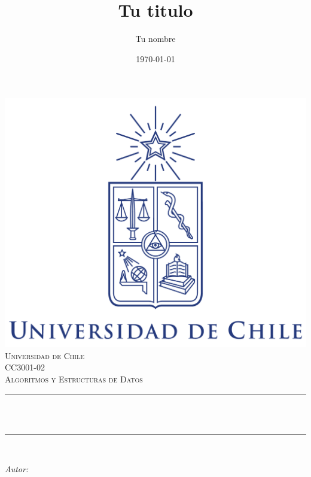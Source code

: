 \documentclass[12pt]{article}
\title{Tu titulo}					%
\author{Tu nombre}					%
\date{\today}						%
\makeatletter
\let\thetitle\@title
\let\theauthor\@author
\let\thedate\@date
\makeatother
\begin{document}

\begin{titlepage}
	\centering
    \vspace*{0.0 cm}
    \includegraphics[scale = 0.13]{Logo_Uchile_modern.png}\\[1.0 cm]	%
    \textsc{\LARGE Universidad de Chile}\\[2.0 cm]	%
	\textsc{\Large CC3001-02}\\[0.5 cm]				%
	\textsc{\large Algoritmos y Estructuras de Datos}\\[0.5 cm]		%
	\rule{\linewidth}{0.2 mm} \\[0.4 cm]
	{ \huge \bfseries \thetitle}\\
	\rule{\linewidth}{0.2 mm} \\[1.5 cm]
	
	\begin{minipage}{0.4\textwidth}
		\begin{center} \large
			\emph{Autor:}\\
			\theauthor\linebreak
			\end{center}
	\end{minipage}\\[2 cm]
	
	{\large \thedate}\\[2 cm]
 
	\vfill
	
\end{titlepage}
\end{document}

